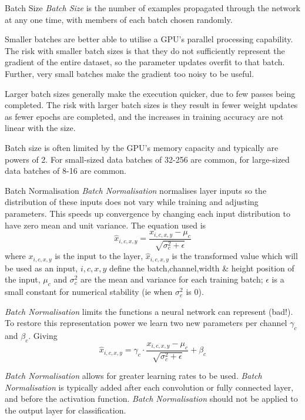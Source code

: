 \documentclass[11pt,a4paper]{article}
\begin{document}
\begin{remark}{Batch Size}
  \textit{Batch Size} is the number of examples propagated through the network at any one time, with members of each batch chosen randomly.
  \par Smaller batches are better able to utilise a GPU's parallel processing capability. The risk with smaller batch sizes is that they do not sufficiently represent the gradient of the entire dataset, so the parameter updates overfit to that batch. Further, very small batches make the gradient too noisy to be useful.
  \par Larger batch sizes generally make the execution quicker, due to few passes being completed. The risk with larger batch sizes is they result in fewer weight updates as fewer epochs are completed, and the increases in training accuracy are not linear with the size.
  \par Batch size is often limited by the GPU's memory capacity and typically are powers of 2. For small-sized data batches of 32-256 are common, for large-sized data batches of 8-16 are common.
\end{remark}

\begin{definition}{Batch Normalisation}
  \textit{Batch Normalisation} normalises layer inputs so the distribution of these inputs does not vary while training and adjusting parameters. This speeds up convergence by changing each input distribution to have zero mean and unit variance. The equation used is
  \[ \hat{x}_{i,c,x,y}=\frac{x_{i,c,x,y}-\mu_c}{\sqrt{\sigma^2_c+\epsilon}} \]
  where $x_{i,c,x,y}$ is the input to the layer, $\hat{x}_{i,c,x,y}$ is the transformed value which will be used as an input, $i,c,x,y$ define the batch,channel,width \& height position of the input, $\mu_c$ and $\sigma^2_c$ are the mean and variance for each training batch; $\epsilon$ is a small constant for numerical stability (ie when $\sigma^2_c$ is 0).
  \par \textit{Batch Normalisation} limits the functions a neural network can represent (bad!). To restore this representation power we learn two new parameters per channel $\gamma_c$ and $\beta_c$. Giving
  \[ \hat{x}_{i,c,x,y}=\gamma_c\cdot\frac{x_{i,c,x,y}-\mu_c}{\sqrt{\sigma^2_c+\epsilon}}+\beta_c \]
  \par \textit{Batch Normalisation} allows for greater learning rates to be used.
  \textit{Batch Normalisation} is typically added after each convolution or fully connected layer, and before the activation function. \textit{Batch Normalisation} should not be applied to the output layer for classification.
\end{definition}
\end{document}
